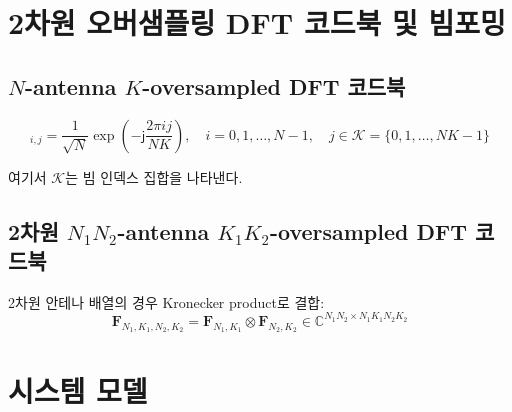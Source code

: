 \documentclass[10pt]{article}
\begin{document}
\section{2차원 오버샘플링 DFT 코드북 및 빔포밍}
\label{sec:dft_codebook}

\subsection{$N$-antenna $K$-oversampled DFT 코드북}
\label{subsec:dft_def}

\begin{equation}
[\mathbf{F}_{N,K}]_{i,j} = \frac{1}{\sqrt{N}} \exp\left(-\mathsf{j}\frac{2\pi ij}{NK}\right), \quad i = 0, 1, \ldots, N-1, \quad j \in \mathcal{K} = \{0, 1, \ldots, NK-1\}
\end{equation}

여기서 $\mathcal{K}$는 빔 인덱스 집합을 나타낸다.

\subsection{2차원 $N_1 N_2$-antenna $K_1 K_2$-oversampled DFT 코드북}
\label{subsec:dft_def_2d}

2차원 안테나 배열의 경우 Kronecker product로 결합:
\begin{equation}
\mathbf{F}_{N_1,K_1,N_2,K_2} = \mathbf{F}_{N_1,K_1} \otimes \mathbf{F}_{N_2,K_2} \in \mathbb{C}^{N_1 N_2 \times N_1 K_1 N_2 K_2}
\end{equation}

\section{시스템 모델}
\label{sec:system_setup}
\end{document}

